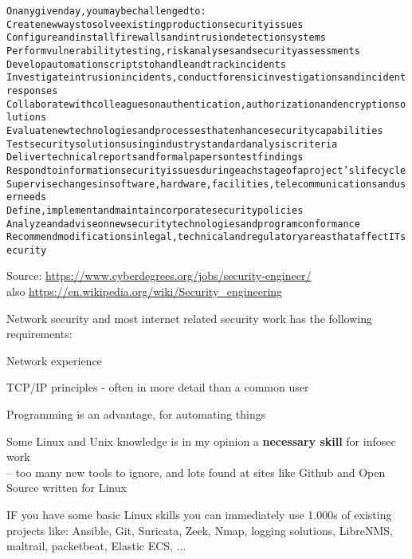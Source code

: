 \documentclass[Screen16to9,17pt]{foils}
\begin{document}
\begin{alltt}\footnotesize
On any given day, you may be challenged to:
    Create new ways to solve existing production security issues
    Configure and install firewalls and intrusion detection systems
    Perform vulnerability testing, risk analyses and security assessments
    Develop automation scripts to handle and track incidents
    Investigate intrusion incidents, conduct forensic investigations and incident responses
    Collaborate with colleagues on authentication, authorization and encryption solutions
    Evaluate new technologies and processes that enhance security capabilities
    Test security solutions using industry standard analysis criteria
    Deliver technical reports and formal papers on test findings
    Respond to information security issues during each stage of a project’s lifecycle
    Supervise changes in software, hardware, facilities, telecommunications and user needs
    Define, implement and maintain corporate security policies
    Analyze and advise on new security technologies and program conformance
    Recommend modifications in legal, technical and regulatory areas that affect IT security
\end{alltt}

Source: \url{https://www.cyberdegrees.org/jobs/security-engineer/}\\
also
\url{https://en.wikipedia.org/wiki/Security_engineering}



\begin{list1}
\item Network security and most internet related security work has the following requirements:
\begin{list2}
\item Network experience
\item TCP/IP principles - often in more detail than a common user
\item Programming is an advantage, for automating things
\item Some Linux and Unix knowledge is in my opinion a {\bf necessary skill} for infosec work\\
-- too many new tools to ignore, and lots found at sites like Github and Open Source written for Linux
\end{list2}
\end{list1}

IF you have some basic Linux skills you can immediately use 1.000s of existing projects like: Ansible, Git, Suricata, Zeek, Nmap, logging solutions, LibreNMS, maltrail, packetbeat, Elastic ECS, ...
\end{document}
